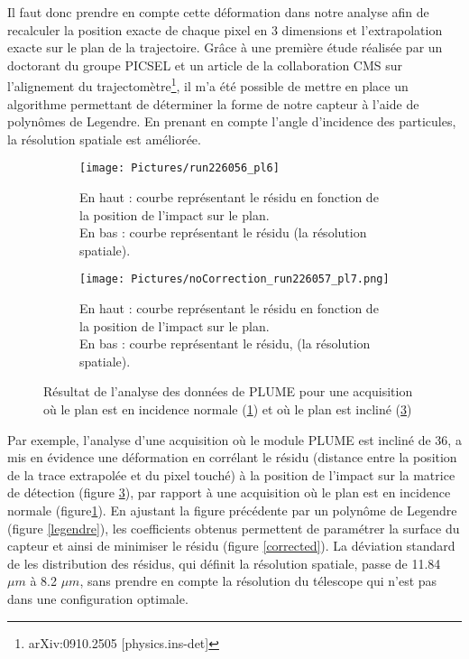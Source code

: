 \documentclass[a4papper, 10pt]{article}
\begin{document}
        Il faut donc prendre en compte cette déformation dans notre analyse afin de recalculer la position exacte de chaque pixel en 3 dimensions et l'extrapolation exacte sur le plan de la trajectoire. Grâce à une première étude réalisée par un doctorant du groupe PICSEL et un article de la collaboration CMS sur l'alignement du trajectomètre\footnote{arXiv:0910.2505 [physics.ins-det]}, il m'a été possible de mettre en place un algorithme permettant de déterminer la forme de notre capteur à l'aide de polynômes de Legendre. 
        En prenant en compte l'angle d'incidence des particules, la résolution spatiale est améliorée. 
    \begin{figure}
    \centering
    \begin{subfigure}[c]{0.46\linewidth}
        \texttt{[image: Pictures/run226056\_pl6]}
        \caption{En haut : courbe représentant le résidu en fonction de la position de l'impact sur le plan.
        \\ En bas : courbe représentant le résidu (la résolution spatiale).}
        \label{normal}
    \end{subfigure}
     \begin{subfigure}[c]{0.46\linewidth}
        \texttt{[image: Pictures/noCorrection\_run226057\_pl7.png]}
        \caption{En haut : courbe représentant le résidu en fonction de la position de l'impact sur le plan.
        \\ En bas : courbe représentant le résidu, (la résolution spatiale).}
        \label{deformed}
    \end{subfigure}
    \caption{Résultat de l'analyse des données de PLUME pour une acquisition où le plan est en incidence normale (\ref{normal}) et où le plan est incliné (\ref{deformed}) }
 \end{figure}     

 Par exemple, l'analyse d'une acquisition où le module PLUME est incliné de 36\degre, a mis en évidence une déformation en corrélant le résidu (distance entre la position de la trace extrapolée et du pixel touché) à la position de l'impact sur la matrice de détection (figure \ref{deformed}), par rapport à une acquisition où le plan est en incidence normale (figure\ref{normal}).
        En ajustant la figure précédente par un polynôme de Legendre (figure \ref{legendre}), les coefficients obtenus permettent de paramétrer la surface du capteur et ainsi de minimiser le résidu (figure \ref{corrected}). 
        La déviation standard de les distribution des résidus, qui définit la résolution spatiale, passe de 11.84 $\mu m$ à 8.2 $\mu m$, sans prendre en compte la résolution du télescope qui n'est pas dans une configuration optimale.
\end{document}
